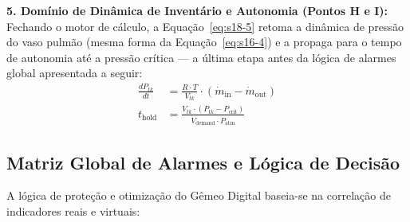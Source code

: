 \documentclass[12pt,a4paper]{article}
\numberwithin{equation}{section}
\numberwithin{table}{section}
\numberwithin{figure}{section}
\begin{document}
\textbf{5. Domínio de Dinâmica de Inventário e Autonomia (Pontos H e I):} Fechando o motor de cálculo, a Equação~\eqref{eq:s18-5} retoma a dinâmica de pressão do vaso pulmão (mesma forma da Equação~\eqref{eq:s16-4}) e a propaga para o tempo de autonomia até a pressão crítica — a última etapa antes da lógica de alarmes global apresentada a seguir:
\begin{equation}\label{eq:s18-5}
\begin{aligned}
	\frac{dP_{tk}}{dt} &= \frac{R \cdotp T}{V_{tk}} \cdotp (\dot{m}_{\text{in}} - \dot{m}_{\text{out}}) \\[8pt]
	t_{\text{hold}} &= \frac{V_{tk} \cdotp (P_{tk} - P_{\text{crit}})}{\dot{V}_{\text{demand}} \cdotp P_{\text{atm}}}
\end{aligned}
\end{equation}

\subsection{Matriz Global de Alarmes e Lógica de Decisão}

A lógica de proteção e otimização do Gêmeo Digital baseia-se na correlação de indicadores reais e virtuais:

\begin{table}[h!]
	\centering
	\caption{Matriz de decisão, alarmes e ações de controle do Gêmeo Digital.}
\end{table}
\end{document}
